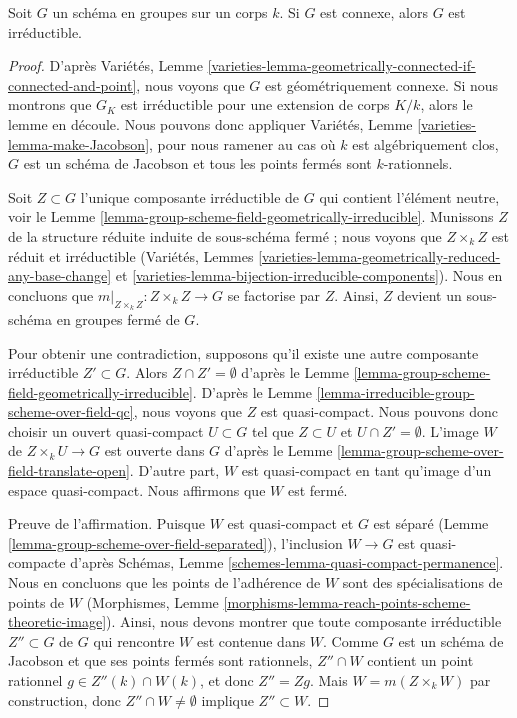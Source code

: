 \begin{lemma}
\label{lemma-connected-group-scheme-over-field-irreducible}
Soit $G$ un schéma en groupes sur un corps $k$. Si $G$ est connexe,
alors $G$ est irréductible.
\end{lemma}

\begin{proof}
D'après Variétés, Lemme
\ref{varieties-lemma-geometrically-connected-if-connected-and-point},
nous voyons que $G$ est géométriquement connexe. Si nous montrons que $G_K$
est irréductible pour une extension de corps $K/k$, alors
le lemme en découle. Nous pouvons donc appliquer
Variétés, Lemme \ref{varieties-lemma-make-Jacobson},
pour nous ramener au cas où $k$ est algébriquement clos,
$G$ est un schéma de Jacobson et tous les points fermés sont $k$-rationnels.

\medskip\noindent
Soit $Z \subset G$ l'unique composante irréductible de $G$ qui contient
l'élément neutre, voir
le Lemme \ref{lemma-group-scheme-field-geometrically-irreducible}.
Munissons $Z$ de la structure réduite induite de sous-schéma fermé ;
nous voyons que $Z \times_k Z$ est réduit et irréductible
(Variétés, Lemmes
\ref{varieties-lemma-geometrically-reduced-any-base-change} et
\ref{varieties-lemma-bijection-irreducible-components}).
Nous en concluons que $m|_{Z \times_k Z} : Z \times_k Z \to G$ se factorise
par $Z$. Ainsi, $Z$ devient un sous-schéma en groupes fermé de $G$.

\medskip\noindent
Pour obtenir une contradiction, supposons qu'il existe une autre composante
irréductible $Z' \subset G$. Alors $Z \cap Z' = \emptyset$ d'après
le Lemme \ref{lemma-group-scheme-field-geometrically-irreducible}.
D'après le Lemme \ref{lemma-irreducible-group-scheme-over-field-qc},
nous voyons que $Z$ est quasi-compact. Nous pouvons donc choisir un ouvert quasi-compact
$U \subset G$ tel que $Z \subset U$ et $U \cap Z' = \emptyset$.
L'image $W$ de $Z \times_k U \to G$ est ouverte dans $G$ d'après
le Lemme \ref{lemma-group-scheme-over-field-translate-open}.
D'autre part, $W$ est quasi-compact en tant qu'image d'un
espace quasi-compact. Nous affirmons que $W$ est fermé.

\medskip\noindent
Preuve de l'affirmation. Puisque $W$ est quasi-compact et $G$ est séparé
(Lemme \ref{lemma-group-scheme-over-field-separated}), l'inclusion
$W \to G$ est quasi-compacte d'après Schémas, Lemme
\ref{schemes-lemma-quasi-compact-permanence}. Nous en concluons que
les points de l'adhérence de $W$ sont des spécialisations de points de $W$
(Morphismes, Lemme \ref{morphisms-lemma-reach-points-scheme-theoretic-image}).
Ainsi, nous devons montrer que toute composante irréductible
$Z'' \subset G$ de $G$ qui rencontre $W$ est contenue dans $W$.
Comme $G$ est un schéma de Jacobson et que ses points fermés sont rationnels,
$Z'' \cap W$ contient un point rationnel
$g \in Z''(k) \cap W(k)$, et donc $Z'' = Zg$. Mais $W = m(Z \times_k W)$
par construction, donc $Z'' \cap W \not = \emptyset$ implique
$Z'' \subset W$.


\end{proof}
